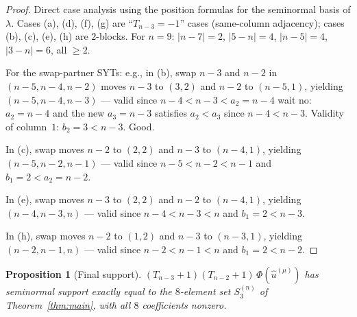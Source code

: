 \documentclass[11pt]{article}
\newtheorem{proposition}[theorem]{Proposition}
\theoremstyle{definition}
\begin{document}
\begin{proof}
Direct case analysis using the position formulas for the
seminormal basis of $\lambda$.  Cases (a), (d), (f), (g) are
``$T_{n-3}=-1$'' cases (same-column adjacency); cases (b), (c),
(e), (h) are $2$-blocks.  For $n=9$: $|n-7|=2$, $|5-n|=4$,
$|n-5|=4$, $|3-n|=6$, all $\ge 2$.

For the swap-partner SYTs: e.g., in (b), swap $n{-}3$ and $n{-}2$
in $(n{-}5,n{-}4,n{-}2)$ moves $n{-}3$ to $(3,2)$ and $n{-}2$ to
$(n{-}5,1)$, yielding $(n{-}5,n{-}4,n{-}3)$ — valid since
$n{-}4<n{-}3<a_2=n{-}4$ wait no: $a_2=n{-}4$ and the new $a_3=n{-}3$
satisfies $a_2<a_3$ since $n{-}4<n{-}3$.  Validity of column~$1$:
$b_2=3<n{-}3$.  Good.

In (c), swap moves $n{-}2$ to $(2,2)$ and $n{-}3$ to $(n{-}4,1)$,
yielding $(n{-}5,n{-}2,n{-}1)$ — valid since
$n{-}5<n{-}2<n{-}1$ and $b_1=2<a_2=n{-}2$.

In (e), swap moves $n{-}3$ to $(2,2)$ and $n{-}2$ to $(n{-}4,1)$,
yielding $(n{-}4,n{-}3,n)$ — valid since $n{-}4<n{-}3<n$ and
$b_1=2<n{-}3$.

In (h), swap moves $n{-}2$ to $(1,2)$ and $n{-}3$ to $(n{-}3,1)$,
yielding $(n{-}2,n{-}1,n)$ — valid since
$n{-}2<n{-}1<n$ and $b_1=2<n{-}2$.
\end{proof}

\begin{proposition}[Final support]\label{prop:final}
$(T_{n-3}{+}1)(T_{n-2}{+}1)\,\Phi(\hat u^{(\mu)})$ has seminormal
support exactly equal to the $8$-element set $S_3^{(n)}$ of
Theorem~\ref{thm:main}, with all $8$ coefficients nonzero.
\end{proposition}
\end{document}
